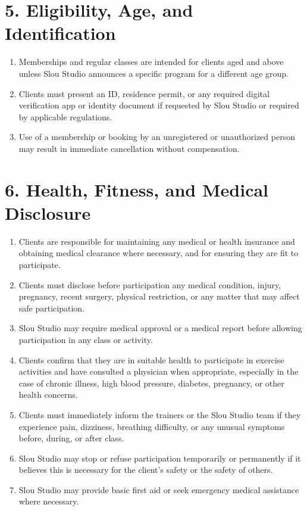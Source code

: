 \documentclass[12pt,a4paper]{article}
\newcommand{\engnum}[1]{\textLR{#1}}
\begin{document}
\section*{5. Eligibility, Age, and Identification}
\begin{enumerate}
    \item Memberships and regular classes are intended for clients aged \engnum{16} and above unless Slou Studio announces a specific program for a different age group.
    \item Clients must present an ID, residence permit, or any required digital verification app or identity document if requested by Slou Studio or required by applicable regulations.
    \item Use of a membership or booking by an unregistered or unauthorized person may result in immediate cancellation without compensation.
\end{enumerate}

\section*{6. Health, Fitness, and Medical Disclosure}
\begin{enumerate}
    \item Clients are responsible for maintaining any medical or health insurance and obtaining medical clearance where necessary, and for ensuring they are fit to participate.
    \item Clients must disclose before participation any medical condition, injury, pregnancy, recent surgery, physical restriction, or any matter that may affect safe participation.
    \item Slou Studio may require medical approval or a medical report before allowing participation in any class or activity.
    \item Clients confirm that they are in suitable health to participate in exercise activities and have consulted a physician when appropriate, especially in the case of chronic illness, high blood pressure, diabetes, pregnancy, or other health concerns.
    \item Clients must immediately inform the trainers or the Slou Studio team if they experience pain, dizziness, breathing difficulty, or any unusual symptoms before, during, or after class.
    \item Slou Studio may stop or refuse participation temporarily or permanently if it believes this is necessary for the client’s safety or the safety of others.
    \item Slou Studio may provide basic first aid or seek emergency medical assistance where necessary.
\end{enumerate}
\end{document}

